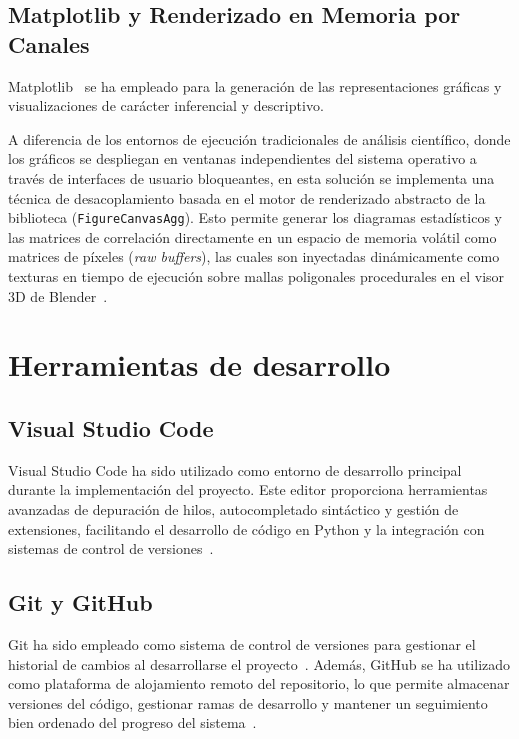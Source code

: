 \subsection{Matplotlib y Renderizado en Memoria por Canales}

Matplotlib~\cite{matplotlib} se ha empleado para la generación de las representaciones gráficas y visualizaciones de carácter inferencial y descriptivo.

A diferencia de los entornos de ejecución tradicionales de análisis científico, donde los gráficos se despliegan en ventanas independientes del sistema operativo a través de interfaces de usuario bloqueantes, en esta solución se implementa una técnica de desacoplamiento basada en el motor de renderizado abstracto de la biblioteca (\texttt{FigureCanvasAgg}). Esto permite generar los diagramas estadísticos y las matrices de correlación directamente en un espacio de memoria volátil como matrices de píxeles (\textit{raw buffers}), las cuales son inyectadas dinámicamente como texturas en tiempo de ejecución sobre mallas poligonales procedurales en el visor 3D de Blender~\cite{munzner2014visualization}.

\section{Herramientas de desarrollo}

\subsection{Visual Studio Code}

Visual Studio Code ha sido utilizado como entorno de desarrollo principal durante la implementación del proyecto. Este editor proporciona herramientas avanzadas de depuración de hilos, autocompletado sintáctico y gestión de extensiones, facilitando el desarrollo de código en Python y la integración con sistemas de control de versiones~\cite{pep8,vscode}.

\subsection{Git y GitHub}

Git ha sido empleado como sistema de control de versiones para gestionar el historial de cambios al desarrollarse el proyecto~\cite{git}. Además, GitHub se ha utilizado como plataforma de alojamiento remoto del repositorio, lo que permite almacenar versiones del código, gestionar ramas de desarrollo y mantener un seguimiento bien ordenado del progreso del sistema~\cite{github}.

